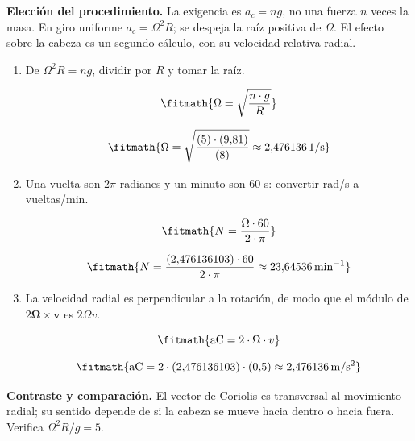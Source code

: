 \noindent\textbf{Elección del procedimiento.} La exigencia es $a_c=ng$, no una fuerza $n$ veces la masa. En giro uniforme $a_c=\Omega^2R$; se despeja la raíz positiva de $\Omega$. El efecto sobre la cabeza es un segundo cálculo, con su velocidad relativa radial.

\begin{enumerate}

\item De $\Omega^2R=ng$, dividir por $R$ y tomar la raíz.

\[\fitmath{\Omega=\sqrt{\frac{n\cdot g}{R}}}\]

\[\fitmath{\Omega=\sqrt{\frac{(5)\cdot (9{,}81)}{(8)}}\approx 2{,}476136\,\mathrm{1/s}}\]

\item Una vuelta son $2\pi$ radianes y un minuto son 60 s: convertir rad/s a vueltas/min.

\[\fitmath{N=\frac{\Omega\cdot 60}{2\cdot \pi}}\]

\[\fitmath{N=\frac{(2{,}476136103)\cdot 60}{2\cdot \pi}\approx 23{,}64536\,\mathrm{min^{-1}}}\]

\item La velocidad radial es perpendicular a la rotación, de modo que el módulo de $2\boldsymbol\Omega\times\boldsymbol v$ es $2\Omega v$.

\[\fitmath{\mathrm{aC}=2\cdot \Omega\cdot v}\]

\[\fitmath{\mathrm{aC}=2\cdot (2{,}476136103)\cdot (0{,}5)\approx 2{,}476136\,\mathrm{m/s^{2}}}\]

\end{enumerate}

\noindent\textbf{Contraste y comparación.} El vector de Coriolis es transversal al movimiento radial; su sentido depende de si la cabeza se mueve hacia dentro o hacia fuera. Verifica $\Omega^2R/g=5$.
